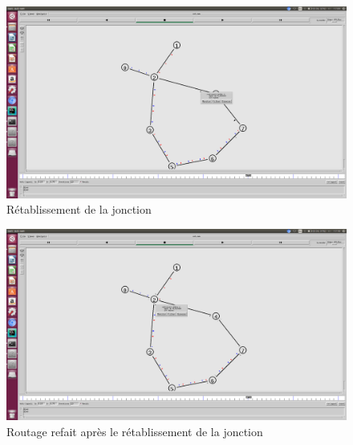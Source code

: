     \begin{figure}
    \centering
    \includegraphics[width=0.99\columnwidth]{./tp2/tp2-1-LS-3-relink.png}
    \caption{Rétablissement de la jonction}
    \end{figure}
    \begin{figure}
    \centering
    \includegraphics[width=0.99\columnwidth]{./tp2/tp2-1-LS-4-relink_triggered.png}
    \caption{Routage refait après le rétablissement de la jonction}
    \end{figure}
